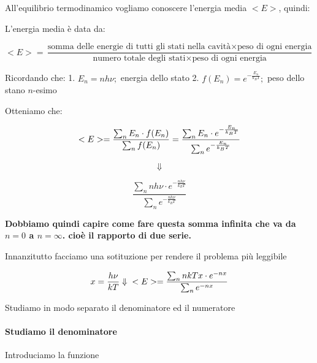\documentclass[11pt]{article}
\begin{document}
All'equilibrio termodinamico vogliamo conoscere l'energia media \(<E>\),
quindi:

L'energia media è data da:

\begin{equation}\label{eq:ener_media}
<E> = \frac{\text{somma delle energie di tutti gli stati nella cavità}\times\text{peso di ogni energia}}{\text{numero totale degli stati}\times\text{peso di ogni energia}}
\end{equation}

    Ricordando che: 1. \(E_n=nh\nu;\) energia dello stato 2.
\(f(E_n)=e^{-\frac{E_n}{k_BT}};\) peso dello stano \(n\)-esimo

    Otteniamo che:

\begin{equation}\label{eq:energia media}
<E>=\frac{\sum_{n}E_n\cdot f(E_n)}{\sum_{n} f(E_n)}=\frac{\sum_{n}E_n\cdot e^{-\frac{E_n}{k_BT}}}{\sum_{n} e^{-\frac{E_n}{k_BT}}}\\
\end{equation}

    \[
\Downarrow
\]

\begin{equation}\label{eq:energia media1}
    \frac{\sum_{n}nh\nu\cdot e^{-\frac{nh\nu}{k_BT}}}{\sum_{n} e^{-\frac{nh\nu}{k_BT}}}
\end{equation}

    \textbf{Dobbiamo quindi capire come fare questa somma infinita che va da
\(n=0\) a \(n=\infty\). cioè il rapporto di due serie.}

Innanzitutto facciamo una sotituzione per rendere il problema più
leggibile

\begin{equation}\label{eq:energia media_1}
 x=\frac{h\nu}{kT}\\
 \, \\
 \Downarrow \\
 \, \\
 <E> = \frac{\sum_{n}nkTx\cdot e^{-nx}}{\sum_{n}  e^{-nx}}
\end{equation}

    Studiamo in modo separato il denominatore ed il numeratore

\hypertarget{studiamo-il-denominatore}{%
\paragraph{Studiamo il denominatore}\label{studiamo-il-denominatore}}

Introduciamo la funzione
\end{document}
